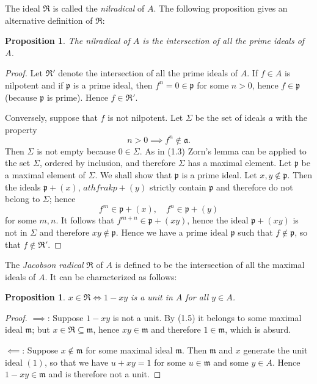 \documentclass[class=book, crop=false]{standalone}
\newtheorem{proposition}[theorem]{Proposition}
\theoremstyle{definition}
\theoremstyle{remark}
\begin{document}
The ideal $\Re$ is called the \textit{nilradical} of $A$. The following
proposition gives an alternative definition of $\Re$:

\begin{proposition}
  The nilradical of $A$ is the intersection of all the prime ideals of $A$.
\end{proposition}
\begin{proof}
  Let $\Re'$ denote the intersection of all the prime ideals of $A$. If
  $f \in A$ is nilpotent and if $\mathfrak{p}$ is a prime ideal, then
  $f^{n}=0 \in \mathfrak{p}$ for some $n>0$, hence $f \in \mathfrak{p}$ (because
  $\mathfrak{p}$ is prime). Hence $f \in \Re'$.

  Conversely, suppose that $f$ is not nilpotent. Let $\Sigma$ be the set of
  ideals $a$ with the property
  \[
    n>0 \implies f^{n} \notin \mathfrak{a}.
  \]
  Then $\Sigma$ is not empty because $0 \in \Sigma$. As in (1.3) Zorn's lemma
  can be applied to the set $\Sigma$, ordered by inclusion, and therefore
  $\Sigma$ has a maximal element. Let $\mathfrak{p}$ be a maximal element of
  $\Sigma$. We shall show that $\mathfrak{p}$ is a prime ideal. Let
  $x, y \notin \mathfrak{p}$. Then the ideals $\mathfrak{p}+(x)$,
  $athfrak{p}+(y)$ strictly contain $\mathfrak{p}$ and therefore do not belong
  to $\Sigma$; hence
  \[
    f^{m} \in \mathfrak{p}+(x), \quad f^{n} \in \mathfrak{p}+(y)
  \]
  for some $m, n$. It follows that $f^{m+n} \in \mathfrak{p}+(x y)$, hence the
  ideal $\mathfrak{p}+(x y)$ is not in $\Sigma$ and therefore
  $x y \notin \mathfrak{p}$. Hence we have a prime ideal $\mathfrak{p}$ such
  that $f \notin \mathfrak{p}$, so that $f \not\in\Re'$.
\end{proof}

The \textit{Jacobson radical} $\Re$ of $A$ is defined to be the intersection of
all the maximal ideals of $A$. It can be characterized as follows:
\begin{proposition}
  $x \in \Re \iff 1-x y$ is a unit in $A$ for all $y \in A$.
\end{proposition}
\begin{proof}
  $\implies$: Suppose $1-x y$ is not a unit. By (1.5) it belongs to some maximal
  ideal $\mathfrak{m}$; but $x \in \Re \subseteq \mathfrak{m}$, hence
  $x y \in \mathfrak{m}$ and therefore $1 \in \mathfrak{m}$, which is absurd.

  $\impliedby$: Suppose $x \notin \mathfrak{m}$ for some maximal ideal
  $\mathfrak{m}$. Then $\mathfrak{m}$ and $x$ generate the unit ideal $(1)$, so
  that we have $u+x y=1$ for some $u \in \mathfrak{m}$ and some $y \in A$. Hence
  $1-x y \in \mathfrak{m}$ and is therefore not a unit.
\end{proof}
\end{document}
